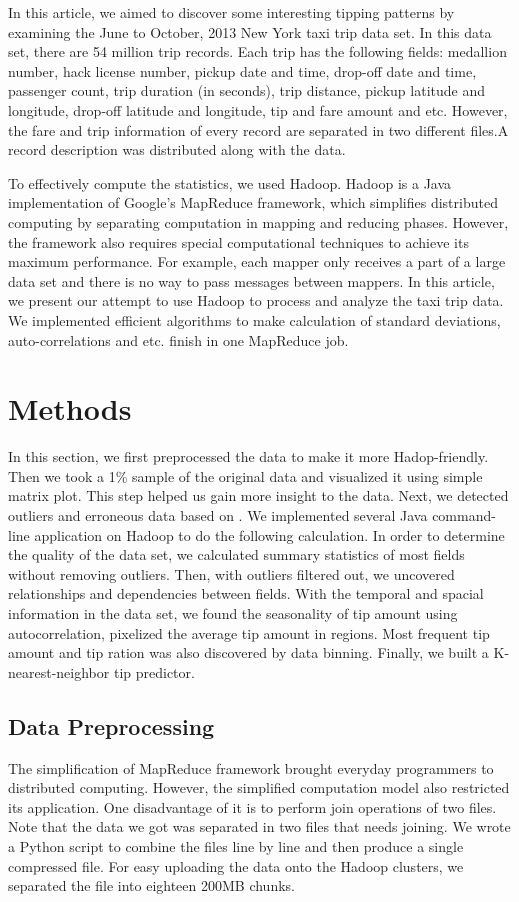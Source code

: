 \documentclass[12pt,a4paper]{article}
\begin{document}
In this article, we aimed to discover some interesting tipping patterns by examining the June to October, 2013 New York taxi trip data set. In this data set, there are 54 million trip records. Each trip has the following fields: medallion number, hack license number, pickup date and time, drop-off date and time, passenger count, trip duration (in seconds), trip distance, pickup latitude and longitude, drop-off latitude and longitude, tip and fare amount and etc. However, the fare and trip information of every record are separated in two different files.A record description was distributed along with the data\cite{nyctaxidatadict}.

To effectively compute the statistics, we used Hadoop. Hadoop is a Java implementation of Google's MapReduce framework, which simplifies distributed computing by separating computation in mapping and reducing phases. However, the framework also requires special computational techniques to achieve its maximum performance. For example, each mapper only receives a part of a large data set and there is no way to pass messages between mappers. In this article, we present our attempt to use Hadoop to process and analyze the taxi trip data. We implemented efficient algorithms to make calculation of standard deviations, auto-correlations and etc. finish in one MapReduce job.

\section{Methods}
In this section, we first preprocessed the data to make it more Hadop-friendly. Then we took a 1\% sample of the original data and visualized it using simple matrix plot. This step helped us gain more insight to the data. Next, we detected outliers and erroneous data based on \cite{andrewj}. We implemented several Java command-line application on Hadoop to do the following calculation\cite{projrepo}. In order to determine the quality of the data set, we calculated summary statistics of most fields without removing outliers. Then, with outliers filtered out, we uncovered relationships and dependencies between fields. With the temporal and spacial information in the data set, we found the seasonality of tip amount using autocorrelation, pixelized the average tip amount in regions. Most frequent tip amount and tip ration was also discovered by data binning. Finally, we built a K-nearest-neighbor tip predictor. 

\subsection{Data Preprocessing}
The simplification of MapReduce framework brought everyday programmers to distributed computing. However, the simplified computation model also restricted its application. One disadvantage of it is to perform join operations of two files. Note that the data we got was separated in two files that needs joining. We wrote a Python script to combine the files line by line and then produce a single compressed file. For easy uploading the data onto the Hadoop clusters, we separated the file into eighteen 200MB chunks. 
\end{document}
